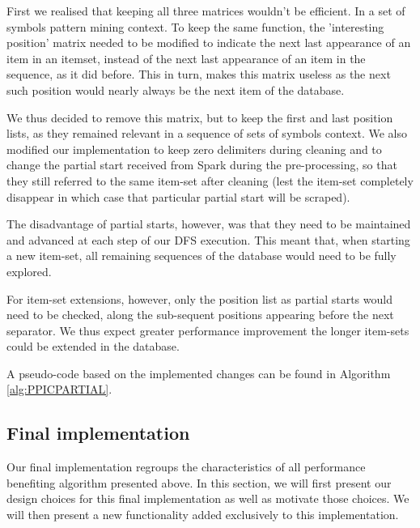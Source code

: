 \documentclass{eplmastersthesis}
\begin{document}
First we realised that keeping all three matrices wouldn't be efficient. In a set of symbols pattern mining context. To keep the same function, the 'interesting position' matrix needed to be modified to indicate the next last appearance of an item in an itemset, instead of the next last appearance of an item in the sequence, as it did before. This in turn, makes this matrix useless as the next such position would nearly always be the next item of the database. \newline

We thus decided to remove this matrix, but to keep the first and last position lists, as they remained relevant in a sequence of sets of symbols context.
We also modified our implementation to keep zero delimiters during cleaning and to change the partial start received from Spark during the pre-processing, so that they still referred to the same item-set after cleaning (lest the item-set completely disappear in which case that particular partial start will be scraped). \newline

The disadvantage of partial starts, however, was that they need to be maintained and advanced at each step of our DFS execution. This meant that, when starting a new item-set, all remaining sequences of the database would need to be fully explored. \newline

For item-set extensions, however, only the position list as partial starts would need to be checked, along the sub-sequent positions appearing before the next separator. We thus expect greater performance improvement the longer item-sets could be extended in the database. \newline

A pseudo-code based on the implemented changes can be found in Algorithm \ref{alg:PPICPARTIAL}.

\subsection{Final implementation}

Our final implementation regroups the characteristics of all performance benefiting algorithm presented above. In this section, we will first present our design choices for this final implementation as well as motivate those choices. We will then present a new functionality added exclusively to this implementation. \newline
\end{document}
